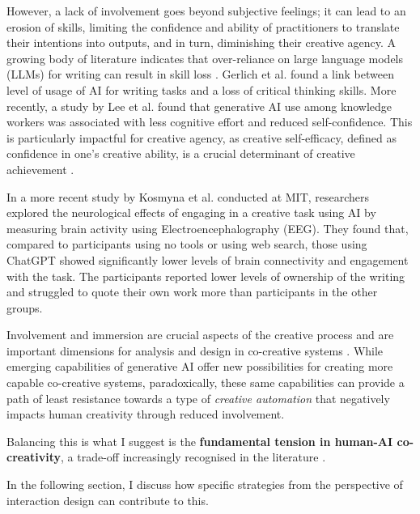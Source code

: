 However, a lack of involvement goes beyond subjective feelings; it can lead to an erosion of skills, limiting the confidence and ability of practitioners to translate their intentions into outputs, and in turn, diminishing their creative agency. A growing body of literature indicates that over-reliance on large language models (LLMs) for writing can result in skill loss \cite{Heersmink2024-mk, Rafner2021-tm}. Gerlich et al. \cite{Gerlich2025-as} found a link between level of usage of AI for writing tasks and a loss of critical thinking skills. More recently, a study by Lee et al. \cite{Lee2025-dw} found that generative AI use among knowledge workers was associated with less cognitive effort and reduced self-confidence. This is particularly impactful for creative agency, as creative self-efficacy, defined as confidence in one's creative ability, is a crucial determinant of creative achievement \cite{Tierney2002-xp}.

In a more recent study by Kosmyna et al. \cite{Kosmyna2025-cm} conducted at MIT, researchers explored the neurological effects of engaging in a creative task using AI by measuring brain activity using Electroencephalography (EEG). They found that, compared to participants using no tools or using web search, those using ChatGPT showed significantly lower levels of brain connectivity and engagement with the task. The participants reported lower levels of ownership of the writing and struggled to quote their own work more than participants in the other groups.

Involvement and immersion are crucial aspects of the creative process \cite{Amabile1996-pt, Csikszentmihalyi1997-ui} and are important dimensions for analysis and design in co-creative systems \cite{Davis2016-te, Cherry2014-ty, Rezwana2022-ui, Clark2018-yf, Lawton2023-gd, Yuan2022-kb, Li2024-yh, Kantosalo2015-pk, Resnick2005-fs}. While emerging capabilities of generative AI offer new possibilities for creating more capable co-creative systems, paradoxically, these same capabilities can provide a path of least resistance towards a type of \textit{creative automation} that negatively impacts human creativity through reduced involvement. 

Balancing this is what I suggest is the \textbf{fundamental tension in human-AI co-creativity}, a trade-off increasingly recognised in the literature \cite{Moruzzi2024-cq}.

In the following section, I discuss how specific strategies from the perspective of interaction design can contribute to this. 

